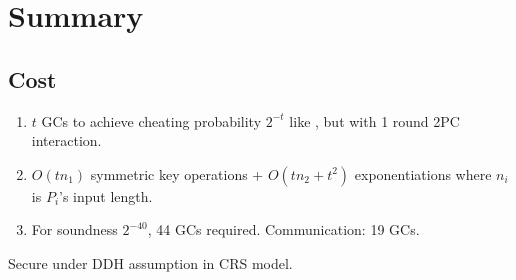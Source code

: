 
\clearpage
{}

%
\setcounter{section}{0} %

\section{Summary}

\subsection{Cost}
\begin{enumerate}
    \item $t$ GCs to achieve cheating probability $2^{-t}$ like \cite{Lin13}, but with 1 round 2PC interaction.
    \item $O(tn_1)$ symmetric key operations + $O(tn_2 + t^2)$ exponentiations where $n_i$ is $P_i$'s input length.
    \item For soundness $2^{-40}$, 44 GCs required. Communication: 19 GCs.
\end{enumerate}

Secure under DDH assumption in CRS model.

